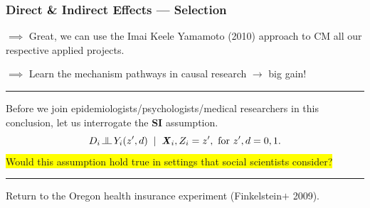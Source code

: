 \documentclass[dvipsnames,handout]{beamer} %
\renewcommand{\vec}[1]{\boldsymbol{\mathit{#1}}}                           %
\newcommand{\indep}{\, \raisebox{0.05em}{\rotatebox[origin=c]{90}{$\models$}} \,}%
\begin{document}
\begin{frame}
    \frametitle{Direct \& Indirect Effects --- Selection} 
    $\implies$ Great, we can use the Imai Keele Yamamoto (2010) approach to CM all our respective applied projects.

    $\implies$ Learn the mechanism pathways in causal research
    $\to$ big gain!
    \par\noindent\rule{\textwidth}{0.4pt}

    Before we join epidemiologists/psychologists/medical researchers in this conclusion, let us interrogate the \textbf{SI} assumption.
    \[ D_i \indep Y_i(z', d) \;\; | \;\; \vec X_i, Z_i = z',
    \text{ for } z', d = 0, 1. \]
    \colorbox{yellow}{Would this assumption hold true in settings that social scientists consider?}
    \par\noindent\rule{\textwidth}{0.4pt}
    \pause  
    Return to the Oregon health insurance experiment (Finkelstein$+$ 2009).
    \vspace{-0.4cm}


\end{frame}
\end{document}
